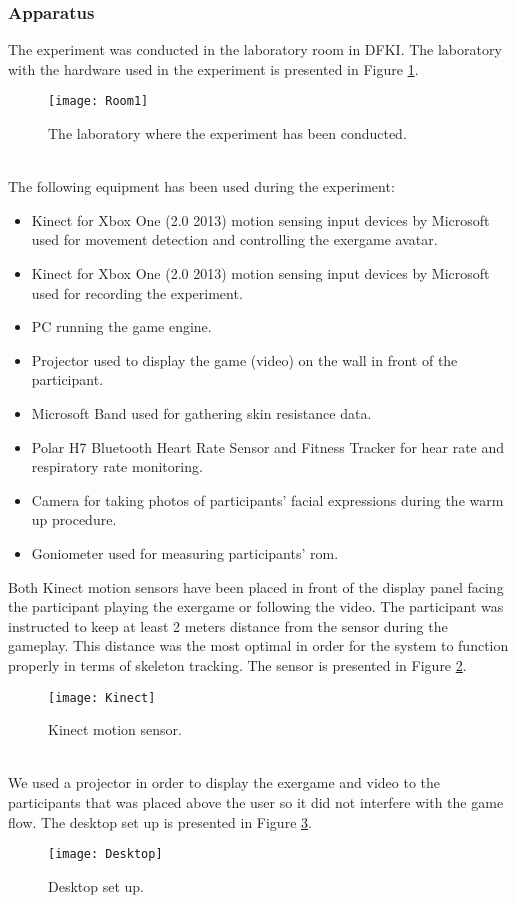 \subsubsection{Apparatus}
The experiment was conducted in the laboratory room in DFKI. The laboratory with the hardware used in the experiment is presented in Figure \ref{fig:lab1}.\\ 
\begin{figure}[h]
    \centering
    \texttt{[image: Room1]}
    \caption{The laboratory where the experiment has been conducted.}
    \label{fig:lab1}
\end{figure}\\
The following equipment has been used during the experiment:
\begin{itemize}
\item Kinect for Xbox One (2.0 2013) motion sensing input devices by Microsoft used for movement detection and controlling the exergame avatar. 
\item Kinect for Xbox One (2.0 2013) motion sensing input devices by Microsoft used for recording the experiment. 
\item PC running the game engine.
\item Projector used to display the game (video) on the wall in front of the participant.
\item Microsoft Band used for gathering skin resistance data.
\item Polar H7 Bluetooth Heart Rate Sensor and Fitness Tracker for hear rate and respiratory rate monitoring.
\item Camera for taking photos of participants' facial expressions during the warm up procedure.
\item Goniometer used for measuring participants' \acrshort{rom}.
\end{itemize}\pagebreak
Both Kinect motion sensors have been placed in front of the display panel facing the participant playing the exergame or following the video. The participant was instructed to keep at least 2 meters distance from the sensor during the gameplay. This distance was the most optimal in order for the system to function properly in terms of skeleton tracking. The sensor is presented in Figure \ref{fig:kinect}.\\
\begin{figure}[h]
    \centering
    \texttt{[image: Kinect]}
    \caption{Kinect motion sensor.}
    \label{fig:kinect}
\end{figure}\\
We used a projector in order to display the exergame and video to the participants that was placed above the user so it did not interfere with the game flow. The desktop set up is presented in Figure \ref{fig:desktop}.\\
\begin{figure}[h]
    \centering
    \texttt{[image: Desktop]}
    \caption{Desktop set up.}
    \label{fig:desktop}
\end{figure}
